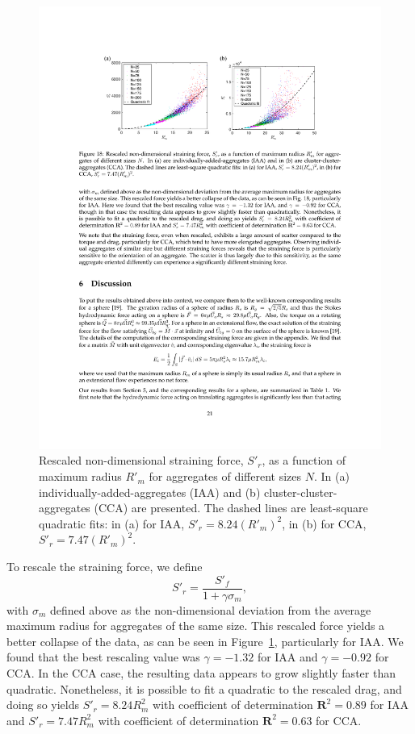 \begin{figure}[ht]
	\begin{center}
		\includegraphics[scale = 1.0]{./figures/fig_strain_all_rescaledprime.pdf}
	\end{center}
	\caption{Rescaled non-dimensional straining force, $S'_r$, as a function of maximum radius $R'_m$ for aggregates of different sizes $N$. In (a) individually-added-aggregates (IAA) and (b) cluster-cluster-aggregates (CCA) are presented. The dashed lines are least-square quadratic fits: in (a) for IAA, $S'_r = 8.24  (R'_m)^2 $, in (b) for CCA, $S'_r = 7.47 (R'_m)^2 $. }
	\label{fig_strain_maxR_rescaled}
\end{figure}


To rescale the straining force, we define
\[
S'_r = \frac{S'_f}{1 + \gamma \sigma_m},
\label{eq_strain_rescaled}
\]
with $\sigma_m$ defined above as the non-dimensional deviation from the average maximum radius for aggregates of the same size.
This rescaled force yields a better collapse of the data, as can be seen in Figure~\ref{fig_strain_maxR_rescaled}, particularly for IAA. We found that the best rescaling value was $\gamma = -1.32$ for  IAA and $\gamma= -0.92$ for  CCA.  In the CCA case, the resulting data appears to grow slightly faster than quadratic. Nonetheless, it is possible to fit a quadratic to the rescaled drag, and doing so yields $S'_r = 8.24 R_m^2 $ with coefficient of determination $\mathbf{R}^2=0.89$ for IAA and $S'_r = 7.47 R_m^2 $ with coefficient of determination $\mathbf{R}^2=0.63$ for CCA. 


